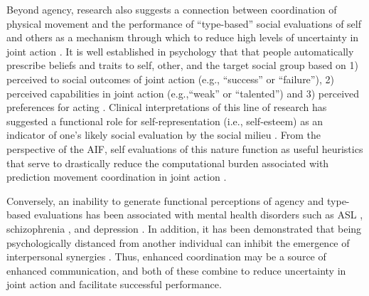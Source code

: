 \begin{CJK}{UTF8}{gbsn}
Beyond agency, research also suggests a connection between coordination of physical movement and the performance of ``type-based'' social evaluations of self and others as a mechanism through which to reduce high levels of uncertainty in joint action \citep{Moutoussis2011,Moutoussis2014}.  It is well established in psychology that that people automatically prescribe beliefs and traits to self, other, and the target social group based on 1) perceived to social outcomes of joint action (e.g., ``success'' or ``failure''), 2) perceived capabilities in joint action (e.g.,``weak'' or ``talented'') and 3) perceived preferences for acting \citep[e.g., ``good,'' ``fair,'' or ``trustworthy'';][]{Bem1967,Fowler2006}.  Clinical interpretations of this line of research has suggested a functional role for self-representation (i.e., self-esteem) as an indicator of one's likely social evaluation by the social milieu \citep{Leary1995}. From the perspective of the AIF, self evaluations of this nature function as useful heuristics that serve to drastically reduce the computational burden associated with prediction movement coordination in joint action \citep{Moutoussis2011}.

Conversely, an inability to generate functional perceptions of agency and type-based evaluations has been associated with mental health disorders such as ASL \citep{Friston2015}, schizophrenia \citep{Frith2007}, and depression \citep{Moutoussis2011}.  In addition, it has been demonstrated that being psychologically distanced from another individual can inhibit the emergence of interpersonal synergies \citep{Miles2010}.  Thus, enhanced coordination may be a source of enhanced communication, and both of these combine to reduce uncertainty in joint action and facilitate successful performance.


\end{CJK}
